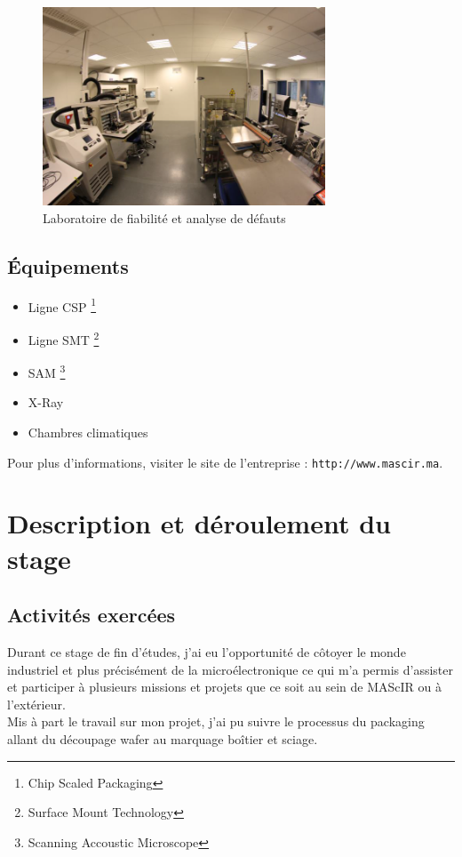 \documentclass[11pt, a4paper, twoside]{book}
\begin{document}
\begin{figure}[H]
\centering
\includegraphics[width=0.75\textwidth]{labo}
\caption{Laboratoire de fiabilité et analyse de défauts}
\end{figure}

\subsection{Équipements}
\begin{itemize}
\item Ligne CSP \footnote{Chip Scaled Packaging}
\item Ligne SMT \footnote{Surface Mount Technology}
\item SAM \footnote{Scanning Accoustic Microscope}
\item X-Ray
\item Chambres climatiques
\end{itemize}

Pour plus d'informations, visiter le site de l'entreprise : \texttt{http://www.mascir.ma}.

\section{Description et déroulement du stage}
\subsection{Activités exercées}
Durant ce stage de fin d’études, j’ai eu l’opportunité de côtoyer le monde industriel et plus précisément de la microélectronique ce qui m’a permis d’assister et participer à plusieurs missions et projets que ce soit au sein de MAScIR ou à l’extérieur.\\

Mis à part le travail sur mon projet, j’ai pu suivre le processus du packaging allant du découpage wafer au marquage boîtier et sciage.\\
\end{document}
